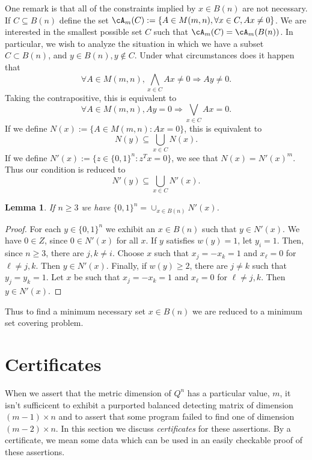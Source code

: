 \documentclass{article}
\newtheorem{lemma}{Lemma}
\begin{document}
One remark is that all of the constraints implied by $x \in B(n)$ are
not necessary.  If $C \subseteq B(n)$ define the set
$\cA_m(C) := \{A \in M(m,n), \forall x \in C, Ax \ne 0\}$.  We are
interested in the smallest possible set $C$ such that $\cA_m(C) = \cA_m(B(n))$.
In particular, we wish to analyze the situation in
which we have a subset $C \subset B(n)$, and $y \in B(n), y \not \in
C$.  Under what circumstances does it happen that
\begin{displaymath}
  \forall A \in M(m,n), \bigwedge_{x \in C} Ax \ne 0 \Rightarrow Ay
  \ne 0.
\end{displaymath}
Taking the contrapositive, this is equivalent to
\begin{displaymath}
  \forall A \in M(m,n), Ay = 0 \Rightarrow \bigvee_{x \in C} Ax = 0.
\end{displaymath}
If we define $N(x) := \{A \in M(m,n): A x = 0\}$, this is equivalent
to
\begin{displaymath}
  N(y) \subseteq \bigcup_{x \in C} N(x).
\end{displaymath}
If we define $N'(x) := \{z \in \{0,1\}^n : z^T x = 0\}$, we see that
$N(x) = N'(x)^m$.  Thus our condition is reduced to
\begin{displaymath}
  N'(y) \subseteq \bigcup_{x \in C} N'(x).
\end{displaymath}
\begin{lemma}
If $n \ge 3$ we have $\{0,1\}^n = \cup_{x \in B(n)} N'(x)$.
\end{lemma}
\begin{proof}
  For each $y \in \{0,1\}^n$ we exhibit an $x \in B(n)$ such that $y
  \in N'(x)$.
  We have  $0 \in Z$, since $0 \in N'(x)$ for all $x$.  If
  $y$ satisfies $w(y) = 1$, let $y_i = 1$. Then, since
  $n \ge 3$, there are $j,k \ne i$.  Choose $x$ such that $x_j = - x_k = 1$ and
  $x_\ell = 0$ for $\ell \ne j,k$. Then $y \in N'(x)$.  Finally, if
  $w(y) \ge 2$, there are $j \ne k$ such that $y_j = y_k = 1$.  Let
  $x$ be such that $x_j = -x_k = 1$ and $x_\ell = 0$ for
  $\ell \ne j,k$. Then $y \in N'(x)$.
\end{proof}
Thus to find a minimum necessary set $x \in B(n)$ we are reduced to a
minimum set covering problem.
\section{Certificates}
\label{sec:certificates}

When we assert that the metric dimension of $Q^n$ has a particular
value, $m$, it isn't sufficicent to exhibit a purported balanced
detecting matrix of dimension $(m-1) \times n$ and to assert that some
program failed to find one of dimension $(m-2) \times n$.  In this
section we discuss \emph{certificates} for these assertions.  By a
certificate, we mean some data which can be used in an easily
checkable proof of these assertions.
\end{document}
